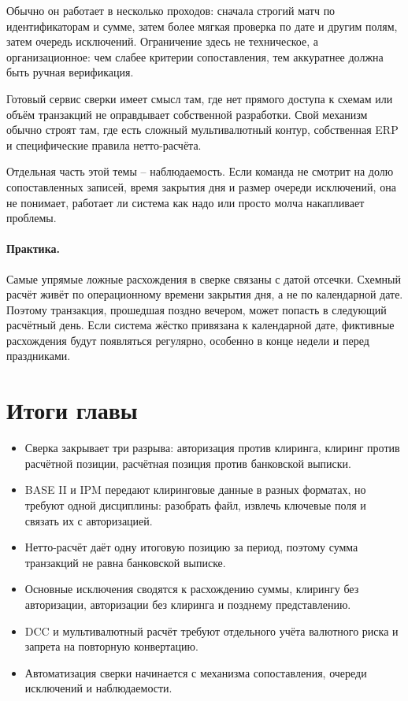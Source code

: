 Обычно он работает в несколько проходов: сначала строгий матч по
идентификаторам и сумме, затем более мягкая проверка по дате и другим
полям, затем очередь исключений. Ограничение здесь не техническое, а
организационное: чем слабее критерии сопоставления, тем аккуратнее
должна быть ручная верификация.

Готовый сервис сверки имеет смысл там, где нет прямого доступа к
схемам или объём транзакций не оправдывает собственной разработки.
Свой механизм обычно строят там, где есть сложный мультивалютный
контур, собственная ERP и специфические правила нетто-расчёта.

Отдельная часть этой темы -- наблюдаемость. Если команда не смотрит на
долю сопоставленных записей, время закрытия дня и размер очереди
исключений, она не понимает, работает ли система как надо или просто
молча накапливает проблемы.

\paragraph{Практика.}
  Самые упрямые ложные расхождения в сверке связаны с датой отсечки.
  Схемный расчёт живёт по операционному времени закрытия дня, а не по
  календарной дате. Поэтому транзакция, прошедшая поздно вечером,
  может попасть в следующий расчётный день. Если система жёстко
  привязана к календарной дате, фиктивные расхождения будут появляться
  регулярно, особенно в конце недели и перед праздниками.


\section*{Итоги главы}
\begin{itemize}
  \item Сверка закрывает три разрыва: авторизация против клиринга,
        клиринг против расчётной позиции, расчётная позиция против
        банковской выписки.
  \item BASE II и IPM передают клиринговые данные в разных форматах, но
        требуют одной дисциплины: разобрать файл, извлечь ключевые поля
        и связать их с авторизацией.
  \item Нетто-расчёт даёт одну итоговую позицию за период, поэтому
        сумма транзакций не равна банковской выписке.
  \item Основные исключения сводятся к расхождению суммы, клирингу без
        авторизации, авторизации без клиринга и позднему представлению.
  \item DCC и мультивалютный расчёт требуют отдельного учёта валютного
        риска и запрета на повторную конвертацию.
  \item Автоматизация сверки начинается с механизма сопоставления,
        очереди исключений и наблюдаемости.
\end{itemize}
